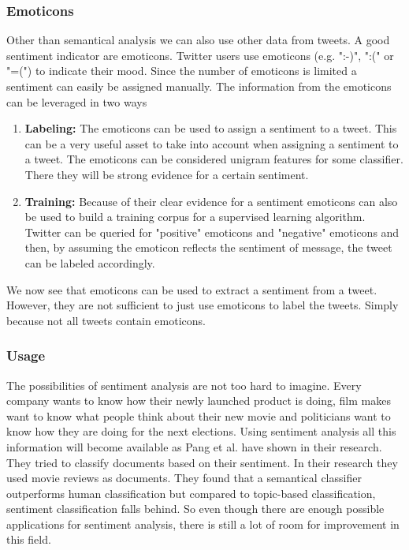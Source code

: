 \documentclass{article}
\begin{document}
\subsubsection{Emoticons}
Other than semantical analysis we can also use other data from tweets. A good sentiment indicator are emoticons. Twitter users use emoticons (e.g. ":-)", ":(" or "=(") to indicate their mood.\cite{twitterSentiment} Since the number of emoticons is limited a sentiment can easily be assigned manually. The information from the emoticons can be leveraged in two ways
\begin{enumerate}
\item \textbf{Labeling:} The emoticons can be used to assign a sentiment to a tweet. This can be a very useful asset to take into account when assigning a sentiment to a tweet. The emoticons can be considered unigram features for some classifier. There they will be strong evidence for a certain sentiment.
\item \textbf{Training:} Because of their clear evidence for a sentiment emoticons can also be used to build a training corpus for a supervised learning algorithm. Twitter can be queried for "positive" emoticons and "negative" emoticons and then, by assuming the emoticon reflects the sentiment of message, the tweet can be labeled accordingly.\cite{moodLens} 
\end{enumerate}
We now see that emoticons can be used to extract a sentiment from a tweet. However, they are not sufficient to just use emoticons to label the tweets. Simply because not all tweets contain emoticons.
\subsubsection{Usage}
The possibilities of sentiment analysis are not too hard to imagine. Every company wants to know how their newly launched product is doing, film makes want to know what people think about their new movie and politicians want to know how they are doing for the next elections. Using sentiment analysis all this information will become available as Pang et al. \cite{machineLearning} have shown in their research. They tried to classify documents based on their sentiment. In their research they used movie reviews as documents. They found that a semantical classifier outperforms human classification but compared to topic-based classification, sentiment classification falls behind. So even though there are enough possible applications for sentiment analysis, there is still a lot of room for improvement in this field.
\end{document}
